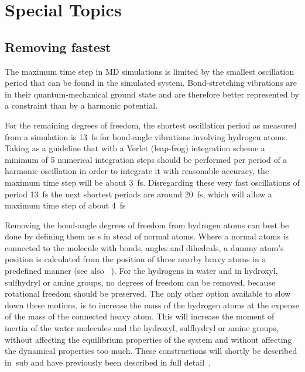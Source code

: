 %
% 
% 
% 
% 
% 
% 
% 
% 
%

\chapter{Special Topics}
\label{ch:special}



\newcommand{\amine}{\sf -NH$_2$}
\newcommand{\amines}{\sf -NH-}
\newcommand{\aminep}{\sf -NH$_3^+$}
\section{Removing fastest }
The maximum time step in MD simulations is limited by the smallest
oscillation period that can be found in the simulated
system. Bond-stretching vibrations are in their quantum-mechanical
ground state and are therefore better represented by a constraint than
by a harmonic potential.

For the remaining degrees of freedom, the shortest oscillation period
as measured from a simulation is 13~fs for bond-angle vibrations
involving hydrogen atoms. Taking as a guideline that with a Verlet
(leap-frog) integration scheme a minimum of 5 numerical integration
steps should be performed per period of a harmonic oscillation in
order to integrate it with reasonable accuracy, the maximum time step
will be about 3~fs. Disregarding these very fast oscillations of
period 13~fs the next shortest periods are around 20~fs, which will
allow a maximum time step of about 4~fs

Removing the bond-angle degrees of freedom from hydrogen atoms can
best be done by defining them as s in stead of
normal atoms. Where a normal atoms is connected to the molecule with
bonds, angles and dihedrals, a dummy atom's position is calculated
from the position of three nearby heavy atoms in a predefined manner
(see also ~). For the hydrogens in water and in
hydroxyl, sulfhydryl or amine groups, no degrees of freedom can be
removed, because rotational freedom should be preserved. The only
other option available to slow down these motions, is to increase the
mass of the hydrogen atoms at the expense of the mass of the connected
heavy atom. This will increase the moment of inertia of the water
molecules and the hydroxyl, sulfhydryl or amine groups, without
affecting the equilibrium properties of the system and without
affecting the dynamical properties too much. These constructions will
shortly be described in~sub and have previously
been described in full detail~\cite{feenstra99}.

